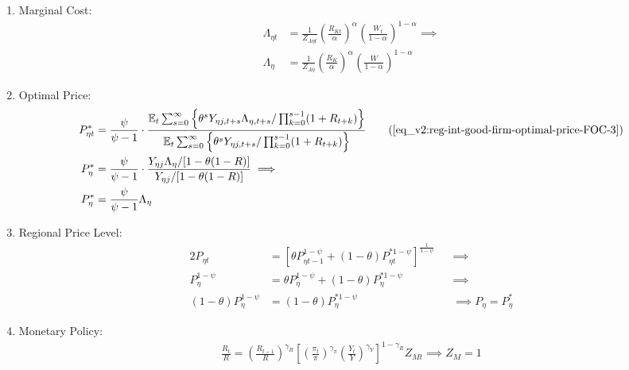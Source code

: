 \documentclass[../thesis.tex]{subfiles}
\begin{document}
\begin{enumerate}
	\item Marginal Cost:
	\begin{align}
		\Lambda_{\eta t} &= \frac{1}{Z_{A\eta t}} \left( \frac{R_{Kt}}{{\alpha_{}}} \right)^{{\alpha_{}}} \left( \frac{W_t}{1-{\alpha_{}}} \right)^{1-{\alpha_{}}} \implies \nonumber \\
		\Lambda_{\eta} &= \frac{1}{Z_{A\eta}} \left( \frac{R_K}{{\alpha_{}}} \right)^{{\alpha_{}}} \left( \frac{W}{1-{\alpha_{}}} \right)^{1-{\alpha_{}}} \label{eq_v2:reg-ss-int-good-firm-MC-2}
	\end{align}
	
	\item Optimal Price:
	\begin{alignat}{2}
		P_{\eta t}^{\ast} &= \frac{\psi}{\psi-1} \cdot \frac{\E \sum_{s=0}^{\infty} \left\{\theta^s Y_{\eta j,t+s} \Lambda_{\eta, t+s} / \prod_{k=0}^{s-1}(1+R_{t+k}) \right\}} {\E \sum_{s=0}^{\infty} \left\{ \theta^s Y_{\eta j,t+s} / \prod_{k=0}^{s-1}(1+R_{t+k}) \right\}} \tag{\ref{eq_v2:reg-int-good-firm-optimal-price-FOC-3}} \\
		P_{\eta}^{\ast} &= \frac{\psi}{\psi-1} \cdot \frac{ Y_{\eta j} \Lambda_{\eta} / [1-\theta(1-R)]} {Y_{\eta j} / [1-\theta(1-R)]} \implies \nonumber \\
		P_{\eta}^{\ast} &= \frac{\psi}{\psi-1} \Lambda_{\eta} \label{eq_v2:reg-ss-int-good-firm-optimal-price-FOC-3}
	\end{alignat}
	
	\item Regional Price Level:
	\begin{alignat}{2}
		P_{\eta t} &= \left[ \theta P_{\eta t-1}^{1-\psi} + (1-\theta) P_{\eta t}^{\ast 1-\psi} \right]^\frac{1}{1-\psi} &&\implies \nonumber \\
		P_{\eta}^{1-\psi} &= \theta P_{\eta}^{1-\psi} + (1-\theta) P_{\eta}^{\ast 1-\psi} &&\implies \nonumber \\ 
		(1-\theta) P_{\eta}^{1-\psi} &= (1-\theta) P_{\eta}^{\ast 1-\psi} &&\implies P_{\eta} = P_{\eta}^{\ast} \label{eq_v2:reg-ss-general-price-level}
	\end{alignat}
	
	\item Monetary Policy:
	\begin{align}
		\label{eq_v2:reg-ss-monetary-policy}
		\frac{R_{t}}{R} =
		\left( \frac{R_{t-1}}{R} \right)^{\gamma_R}  \left[
		\left( \frac{\pi_t}{\pi} \right)^{\gamma_\pi}
		\left( \frac{Y_{t}}{Y} \right)^{\gamma_Y} \right]^{1-\gamma_R} Z_{Mt}
		\implies Z_{M} = 1
	\end{align}
	

\end{enumerate}
\end{document}
